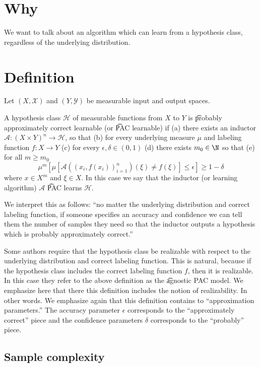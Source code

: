 
\section*{Why}

We want to talk about an algorithm which can learn from a hypothesis class, regardless of the underlying distribution.

  \section*{Definition}

Let $(X, \mathcal{X} )$ and $(Y, \mathcal{Y} )$ be measurable input and output spaces.

A hypothesis class $\mathcal{H} $ of measurable functions from $X$ to $Y$ is \t{probably approximately correct learnable} (or \t{PAC learnable}) if
(a) there exists an inductor $\mathcal{A} : (X \times  Y)^n \to \mathcal{H} $, so that (b) for every underlying measure $\mu $ and labeling function $f: X \to Y$ (c) for every $\epsilon , \delta  \in (0, 1)$ (d) there exists $m_0 \in \N  $ so that (e) for all $m \geq m_0$
\[
\mu ^m\left[
\mu \left[
\mathcal{A} ((x_i, f(x_i))_{i = 1}^{n})(\xi ) \neq f(\xi )
\right]
\leq \epsilon  \right] \geq 1-\delta
\]
where $x \in X^m$ and $\xi  \in X$.
In this case we say that the inductor (or learning algorithm) $\mathcal{A} $ \t{PAC learns} $\mathcal{H} $.

We interpret this as follows: ``no matter the underlying distribution and correct labeling function, if someone specifies an accuracy and confidence we can tell them the number of samples they need so that the inductor outputs a hypothesis which is probably approximately correct.''

Some authors require that the hypothesis class be realizable with respect to the underlying distribution and correct labeling function.
This is natural, because if the hypothesis class includes the correct labeling function $f$, then it is realizable.
In this case they refer to the above definition as the \t{agnostic PAC model}.
We emphasize here that there this definition includes the notion of realizability.
In other words.
We emphasize again that this definition contains to ``approximation parameters.''
The accuracy parameter $\epsilon $ corresponds to the ``approximately correct'' piece and the confidence parameters $\delta $ corresponds to the ``probably'' piece.

\subsection*{Sample complexity}

